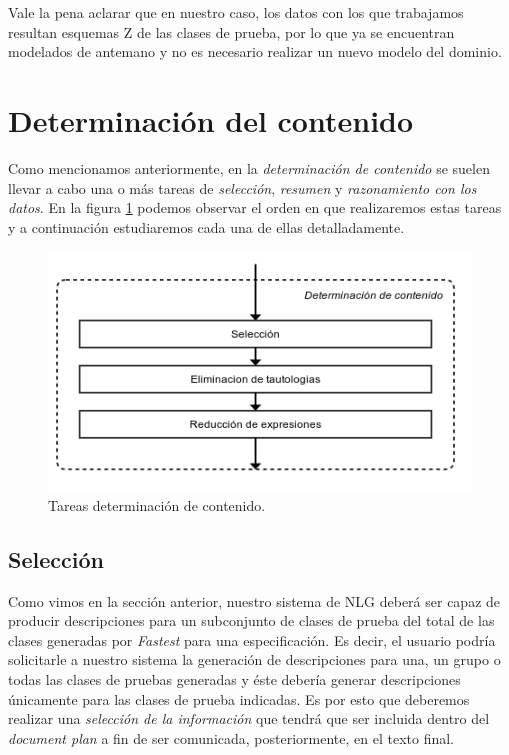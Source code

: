 Vale la pena aclarar que en nuestro caso, los datos con los que trabajamos resultan esquemas Z de las clases de prueba, por lo que ya se encuentran modelados de antemano y no es necesario realizar un nuevo modelo del dominio.
 

\section{Determinación del contenido}
\label{cap:determinacion_contenido}

Como mencionamos anteriormente, en la \emph{determinación de contenido} se suelen llevar a cabo una o más tareas de \emph{selección}, \emph{resumen} y \emph{razonamiento con los datos}. En la figura \ref{fig:tareas_determinacion_contenido} podemos observar el orden en que realizaremos estas tareas y a continuación estudiaremos cada una de ellas detalladamente.

\begin{figure}[H]
  	\centering
	\includegraphics[scale=0.4]{img/tareas_determinacion_contenido.png}
	\caption{Tareas determinación de contenido.}
  	\label{fig:tareas_determinacion_contenido}
\end{figure}

\subsection*{Selección}
Como vimos en la sección anterior, nuestro sistema de NLG deberá ser capaz de producir descripciones para un subconjunto de clases de prueba del total de las clases generadas por \emph{Fastest} para una especificación. Es decir, el usuario podría solicitarle a nuestro sistema la generación de descripciones para una, un grupo o todas las clases de pruebas generadas y éste debería generar descripciones únicamente para las clases de prueba indicadas. Es por esto que deberemos realizar una \emph{selección de la información} que tendrá que ser incluida dentro del \textit{document plan} a fin de ser comunicada, posteriormente, en el texto final.


